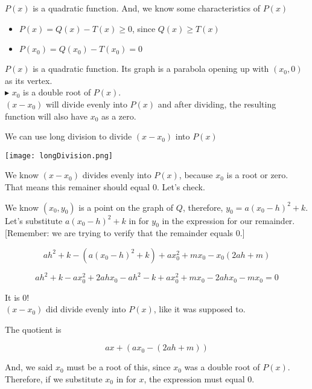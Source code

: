 \documentclass{ximera}
\begin{document}
$P(x)$ is a quadratic function.  And, we know some characteristics of $P(x)$



\begin{itemize}
\item $P(x) = Q(x) - T(x) \geq 0$, since $Q(x) \geq T(x)$
\item $P(x_0) = Q(x_0) - T(x_0) = 0$
\end{itemize}




$P(x)$ is a quadratic function.  Its graph is a parabola opening up with $(x_0, 0)$ as its vertex. \\


\textbf{\textcolor{red!90!darkgray}{$\blacktriangleright$}}  $x_0$ is a double root of $P(x)$. \\


$(x - x_0)$ will divide evenly into $P(x)$ and after dividing, the resulting function will also have $x_0$ as a zero.



We can use long division to divide $(x - x_0)$ into $P(x)$



\begin{image}
\texttt{[image: longDivision.png]}
\end{image}


We know $(x - x_0)$ divides evenly into $P(x)$, because $x_0$ is a root or zero.  That means this remainer should equal $0$.  Let's check.



We know $(x_0, y_0)$ is a point on the graph of $Q$, therefore, $y_0 = a (x_0 - h)^2 + k$. Let's substitute $a (x_0 - h)^2 + k$ in for $y_0$ in the expression for our remainder. [Remember: we are trying to verify that the remainder equals $0$.]

\[
a h^2 + k - (a (x_0 - h)^2 + k) + a x_0^2 + m x_0 - x_0 (2 a h + m)
\]


\[
a h^2 + k - a x_0^2 + 2 a h x_0 - a h^2 - k + a x_0^2 + m x_0 - 2 a h x_0 - m x_0 = 0
\]


It is $0$!   \\


$(x - x_0)$ did divide evenly into $P(x)$, like it was supposed to.

The quotient is 


\[
a x + (a x_0 - (2 a h + m))
\]

And, we said $x_0$ must be a root of this, since $x_0$ was a double root of $P(x)$.  Therefore, if we substitute $x_0$ in for $x$, the expression must equal $0$.
\end{document}
